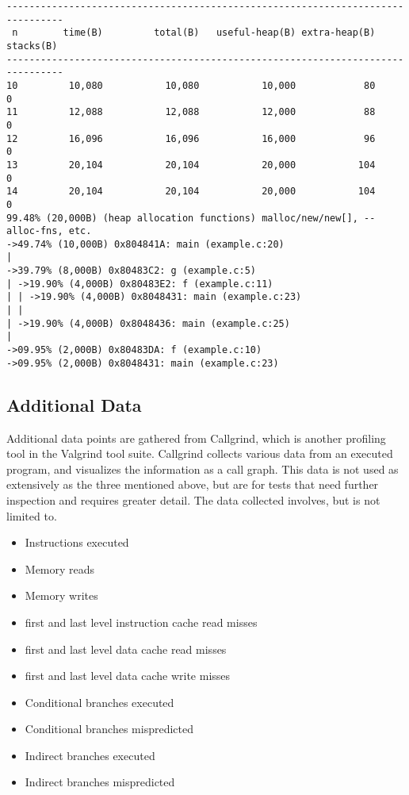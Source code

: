\begin{lstlisting}[basicstyle=\footnotesize, caption={[Massif output example]Massif output example (massif documentation\protect\cite{massif_manual})}, label=lst:massif_output]
--------------------------------------------------------------------------------
 n        time(B)         total(B)   useful-heap(B) extra-heap(B)    stacks(B)
--------------------------------------------------------------------------------
10         10,080           10,080           10,000            80            0
11         12,088           12,088           12,000            88            0
12         16,096           16,096           16,000            96            0
13         20,104           20,104           20,000           104            0
14         20,104           20,104           20,000           104            0
99.48% (20,000B) (heap allocation functions) malloc/new/new[], --alloc-fns, etc.
->49.74% (10,000B) 0x804841A: main (example.c:20)
|
->39.79% (8,000B) 0x80483C2: g (example.c:5)
| ->19.90% (4,000B) 0x80483E2: f (example.c:11)
| | ->19.90% (4,000B) 0x8048431: main (example.c:23)
| |
| ->19.90% (4,000B) 0x8048436: main (example.c:25)
|
->09.95% (2,000B) 0x80483DA: f (example.c:10)
->09.95% (2,000B) 0x8048431: main (example.c:23)
\end{lstlisting}

\subsection{Additional Data}
\label{subsec:measurements_callgrind}
Additional data points are gathered from Callgrind\cite{callgrind_manual}, which is another profiling tool in the Valgrind tool suite.
Callgrind collects various data from an executed program, and visualizes the information as a call graph.
This data is not used as extensively as the three mentioned above,
but are for tests that need further inspection and requires greater detail.
The data collected involves, but is not limited to.

\begin{itemize}
    \item Instructions executed
    \item Memory reads
    \item Memory writes
    \item first and last level instruction cache read misses
    \item first and last level data cache read misses
    \item first and last level data cache write misses
    \item Conditional branches executed
    \item Conditional branches mispredicted
    \item Indirect branches executed
    \item Indirect branches mispredicted
\end{itemize}

